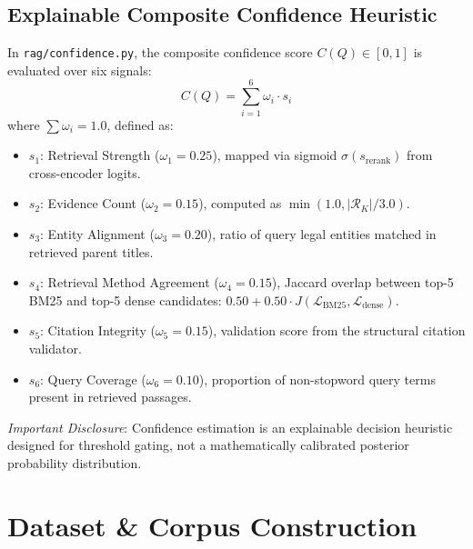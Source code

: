 \documentclass[10pt,twocolumn]{article}
\begin{document}
\subsection{Explainable Composite Confidence Heuristic}
In \texttt{rag/confidence.py}, the composite confidence score $C(Q) \in [0, 1]$ is evaluated over six signals:
\begin{equation}
C(Q) = \sum_{i=1}^6 \omega_i \cdot s_i
\label{eq:conf}
\end{equation}
where $\sum \omega_i = 1.0$, defined as:
\begin{itemize}[leftmargin=*]
    \item $s_1$: Retrieval Strength ($\omega_1 = 0.25$), mapped via sigmoid $\sigma(s_{\text{rerank}})$ from cross-encoder logits.
    \item $s_2$: Evidence Count ($\omega_2 = 0.15$), computed as $\min(1.0, |\mathcal{R}_K| / 3.0)$.
    \item $s_3$: Entity Alignment ($\omega_3 = 0.20$), ratio of query legal entities matched in retrieved parent titles.
    \item $s_4$: Retrieval Method Agreement ($\omega_4 = 0.15$), Jaccard overlap between top-5 BM25 and top-5 dense candidates: $0.50 + 0.50 \cdot J(\mathcal{L}_{\text{BM25}}, \mathcal{L}_{\text{dense}})$.
    \item $s_5$: Citation Integrity ($\omega_5 = 0.15$), validation score from the structural citation validator.
    \item $s_6$: Query Coverage ($\omega_6 = 0.10$), proportion of non-stopword query terms present in retrieved passages.
\end{itemize}

\noindent\textit{Important Disclosure}: Confidence estimation is an explainable decision heuristic designed for threshold gating, not a mathematically calibrated posterior probability distribution.

\section{Dataset \& Corpus Construction}
\label{sec:dataset}
\end{document}

